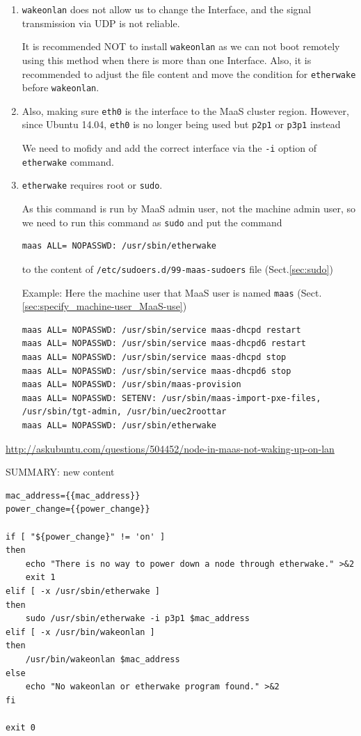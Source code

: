 \begin{enumerate}
  \item \verb!wakeonlan! does not allow us to change the Interface, and the
  signal transmission via UDP is not reliable.

It is recommended NOT to install \verb!wakeonlan! as we can not boot remotely
using this method when there is more than one Interface. Also, it is recommended to
adjust the file content and move the condition for \verb!etherwake! before
\verb!wakeonlan!.

   \item   Also, making sure \verb!eth0! is the interface to the MaaS cluster region. 
However, since Ubuntu 14.04, \verb!eth0! is no longer being used but \verb!p2p1!
or \verb!p3p1! instead

We need to mofidy and add the correct interface via the \verb!-i!
option of \verb!etherwake! command.
   
   \item \verb!etherwake! requires root or \verb!sudo!. 
   
As this command is run  by MaaS admin user, not the machine admin user, so we
need to run this command as \verb!sudo! and put the command 
\begin{verbatim}
maas ALL= NOPASSWD: /usr/sbin/etherwake
\end{verbatim}
to the content of \verb!/etc/sudoers.d/99-maas-sudoers! file (Sect.\ref{sec:sudo})

Example: Here the machine user that MaaS user is named \verb!maas!
(Sect.\ref{sec:specify_machine-user_MaaS-use}) 

{\tiny
\begin{verbatim}
maas ALL= NOPASSWD: /usr/sbin/service maas-dhcpd restart
maas ALL= NOPASSWD: /usr/sbin/service maas-dhcpd6 restart
maas ALL= NOPASSWD: /usr/sbin/service maas-dhcpd stop
maas ALL= NOPASSWD: /usr/sbin/service maas-dhcpd6 stop
maas ALL= NOPASSWD: /usr/sbin/maas-provision
maas ALL= NOPASSWD: SETENV: /usr/sbin/maas-import-pxe-files, /usr/sbin/tgt-admin, /usr/bin/uec2roottar
maas ALL= NOPASSWD: /usr/sbin/etherwake
\end{verbatim}
} 
\end{enumerate}
\url{http://askubuntu.com/questions/504452/node-in-maas-not-waking-up-on-lan}

SUMMARY: new content
\begin{verbatim}
mac_address={{mac_address}}
power_change={{power_change}}

if [ "${power_change}" != 'on' ]
then
    echo "There is no way to power down a node through etherwake." >&2
    exit 1
elif [ -x /usr/sbin/etherwake ]
then
    sudo /usr/sbin/etherwake -i p3p1 $mac_address
elif [ -x /usr/bin/wakeonlan ]
then
    /usr/bin/wakeonlan $mac_address
else
    echo "No wakeonlan or etherwake program found." >&2
fi

exit 0
\end{verbatim}

